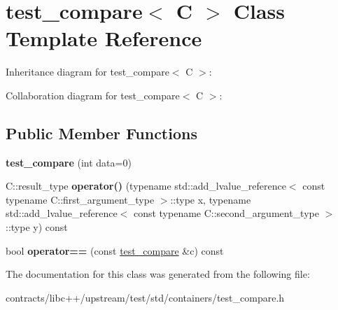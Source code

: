 \hypertarget{classtest__compare}{}\section{test\+\_\+compare$<$ C $>$ Class Template Reference}
\label{classtest__compare}


Inheritance diagram for test\+\_\+compare$<$ C $>$\+:


Collaboration diagram for test\+\_\+compare$<$ C $>$\+:
\subsection*{Public Member Functions}
\begin{DoxyCompactItemize}
\item 
\mbox{\label{classtest__compare_ad4d53aaf64d42d337cdd104bfaed61cb}} 
{\bfseries test\+\_\+compare} (int data=0)
\item 
\mbox{\label{classtest__compare_a90555738a7379f6e8c51997415553408}} 
C\+::result\+\_\+type {\bfseries operator()} (typename std\+::add\+\_\+lvalue\+\_\+reference$<$ const typename C\+::first\+\_\+argument\+\_\+type $>$\+::type x, typename std\+::add\+\_\+lvalue\+\_\+reference$<$ const typename C\+::second\+\_\+argument\+\_\+type $>$\+::type y) const
\item 
\mbox{\label{classtest__compare_a157b31f754abfb7cbd265f891853a530}} 
bool {\bfseries operator==} (const \mbox{\hyperlink{classtest__compare}{test\+\_\+compare}} \&c) const
\end{DoxyCompactItemize}


The documentation for this class was generated from the following file\+:\begin{DoxyCompactItemize}
\item 
contracts/libc++/upstream/test/std/containers/test\+\_\+compare.\+h\end{DoxyCompactItemize}
